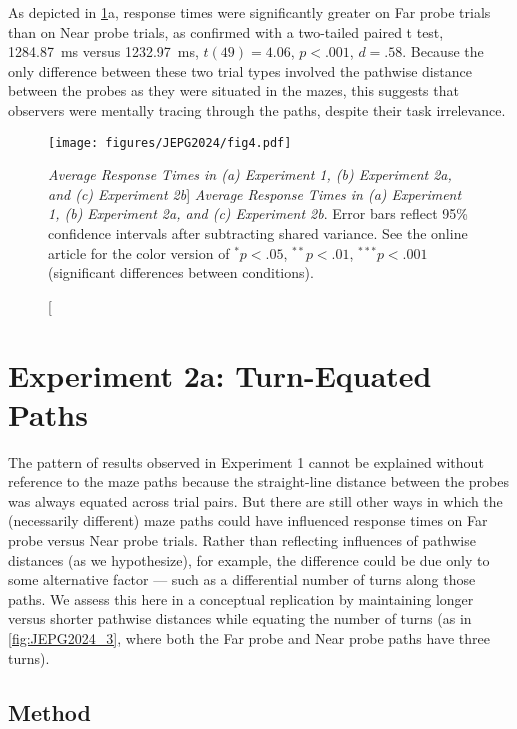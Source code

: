 As depicted in \cref{fig:JEPG2024_4}a, response times were significantly greater on Far probe trials than on Near probe trials, as confirmed with a two-tailed paired t test, \qty{1284.87}{\milli\second} versus \qty{1232.97}{\milli\second}, $t(49) = 4.06$, $p < .001$, $d = .58$. Because the only difference between these two trial types involved the pathwise distance between the probes as they were situated in the mazes, this suggests that observers were mentally tracing through the paths, despite their task irrelevance.
\begin{figure}
    \centering
    \texttt{[image: figures/JEPG2024/fig4.pdf]}
    \caption
    [\textit{Average Response Times in (a) Experiment 1, (b) Experiment 2a, and (c) Experiment 2b}]
    {\textit{Average Response Times in (a) Experiment 1, (b) Experiment 2a, and (c) Experiment 2b}. Error bars reflect 95\% confidence intervals after subtracting shared variance. See the online article for the color version of $^{*}p < .05$, $^{**}p < .01$, $^{***}p < .001$ (significant differences between conditions).}
    \label{fig:JEPG2024_4}
\end{figure}


\section{Experiment 2a: Turn-Equated Paths}
The pattern of results observed in Experiment 1 cannot be explained without reference to the maze paths because the straight-line distance between the probes was always equated across trial pairs. But there are still other ways in which the (necessarily different) maze paths could have influenced response times on Far probe versus Near probe trials. Rather than reflecting influences of pathwise distances (as we hypothesize), for example, the difference could be due only to some alternative factor --- such as a differential number of turns along those paths. We assess this here in a conceptual replication by maintaining longer versus shorter pathwise distances while equating the number of turns (as in \cref{fig:JEPG2024_3}, where both the Far probe and Near probe paths have three turns).

\subsection{Method}

